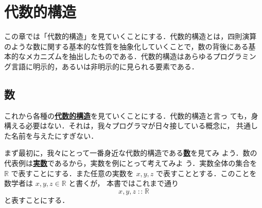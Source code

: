 \documentclass[a5paper,twoside,fleqn,draft]{jsbook}
\newenvironment{leader}{\begingroup\gt}{\endgroup}
\newcommand{\keyword}[1]{{\underline{\textbf{#1}}}}
\DeclareMathOperator{\mIn}{{:\!:}}
\newcommand{\mSpecialSet}[1]{\mathbb{#1}}
\newcommand{\mRSet}{\mSpecialSet{R}}
\begin{document}
\chapter{代数的構造}

\begin{leader}
この章では「代数的構造」を見ていくことにする．代数的構造とは，四則演算
のような数に関する基本的な性質を抽象化していくことで，数の背後にある基
本的なメカニズムを抽出したものである．代数的構造はあらゆるプログラミン
グ言語に明示的，あるいは非明示的に見られる要素である．
\end{leader}

\section{数}

これから各種の\keyword{代数的構造}を見ていくことにする．代数的構造と言っ
ても，身構える必要はない．それは，我々プログラマが日々接している概念に，
共通した名前を与えたにすぎない．

まず最初に，我々にとって一番身近な代数的構造である\keyword{数}を見てみ
よう．数の代表例は\keyword{実数}であるから，実数を例にとって考えてみよ
う．実数全体の集合を $\mRSet$ で表すことにする．また任意の実数を
$x,y,z$ で表すこととする．このことを数学者は $x,y,z\in\mRSet$ と書くが，
本書ではこれまで通り
\begin{equation}
x,y,z\mIn\mRSet
\end{equation}
と表すことにする．
\end{document}
